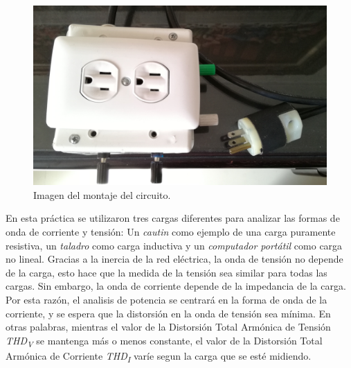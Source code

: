 \documentclass[journal]{IEEEtran}
\begin{document}

\begin{figure}[h]
\centering
\includegraphics[clip,width=\columnwidth]{circuit_box.png}
\caption{Imagen del montaje del circuito.}
\label{circuit_box}
\end{figure}

En esta práctica se utilizaron tres cargas diferentes 
para analizar las formas de onda de corriente y tensión: 
Un \textit{cautin} como ejemplo de una carga puramente 
resistiva, un \textit{taladro} como carga inductiva y un 
\textit{computador portátil} como carga no lineal. 
Gracias a la inercia de la red eléctrica, la onda de 
tensión no depende de la carga, esto hace que la medida de 
la tensión sea similar para todas las cargas. Sin embargo, 
la onda de corriente depende de la impedancia de la carga. 
Por esta razón, el analisis de potencia se centrará 
en la forma de onda de la corriente, y se espera que 
la distorsión en la onda de tensión sea mínima. En otras 
palabras, mientras el valor de la Distorsión Total Armónica
de Tensión \textit{THD\textsubscript{V}} se mantenga más o
menos constante, el valor de la Distorsión Total Armónica
de Corriente \textit{THD\textsubscript{I}} varíe segun 
la carga que se esté midiendo.  \\

\end{document}
